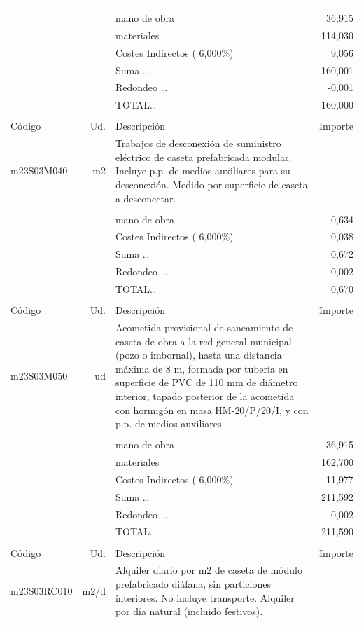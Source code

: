 \begin{supertabular}{l r p{60mm} r}
&&&\\%
&&mano de obra&    36,915\\%
&&materiales&   114,030\\%
&&Costes Indirectos (     6,000\%)&     9,056\\%
&&Suma \ldots&   160,001\\%
&&Redondeo \ldots&    {-}0,001\\%
%
&&TOTAL\ldots&   160,000\\%
&&&\\%
Código&Ud.&Descripción&Importe\\%
\hline%
m23S03M040&m2&Trabajos de desconexión de suministro eléctrico de caseta prefabricada modular. Incluye p.p. de medios auxiliares para su desconexión. Medido por superficie de caseta a desconectar.&\\%
&&&\\%
&&mano de obra&     0,634\\%
&&Costes Indirectos (     6,000\%)&     0,038\\%
&&Suma \ldots&     0,672\\%
&&Redondeo \ldots&    {-}0,002\\%
%
&&TOTAL\ldots&     0,670\\%
&&&\\%
Código&Ud.&Descripción&Importe\\%
\hline%
m23S03M050&ud&Acometida provisional de saneamiento de caseta de obra a la red general municipal (pozo o imbornal), hasta una distancia máxima de 8 m, formada por tubería en superficie de PVC de 110 mm de diámetro interior, tapado posterior de la acometida con hormigón en masa HM{-}20/P/20/I, y con p.p. de medios auxiliares.&\\%
&&&\\%
&&mano de obra&    36,915\\%
&&materiales&   162,700\\%
&&Costes Indirectos (     6,000\%)&    11,977\\%
&&Suma \ldots&   211,592\\%
&&Redondeo \ldots&    {-}0,002\\%
%
&&TOTAL\ldots&   211,590\\%
&&&\\%
Código&Ud.&Descripción&Importe\\%
\hline%
m23S03RC010&m2/d&Alquiler diario por m2 de caseta de módulo prefabricado diáfana, sin particiones interiores. No incluye transporte. Alquiler por día natural (incluido festivos).&\\%

\end{supertabular}

